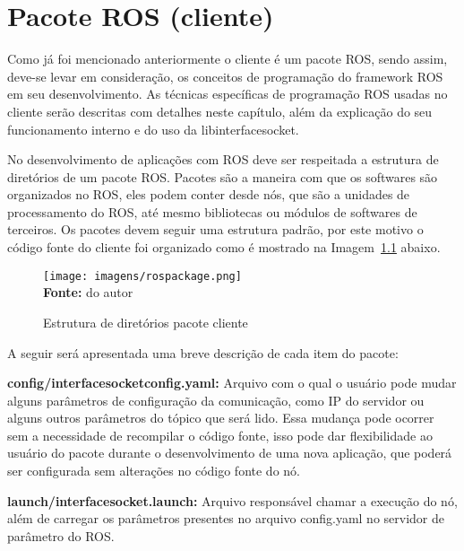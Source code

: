 \chapter{Pacote ROS (cliente)}\label{cap:cliente}

Como já foi mencionado anteriormente o cliente é um pacote ROS, sendo assim, deve-se levar em consideração, os conceitos de programação do framework ROS em seu desenvolvimento. As técnicas específicas de programação ROS usadas no cliente serão descritas com detalhes neste capítulo, além da explicação do seu funcionamento interno e do uso da libinterfacesocket.

No desenvolvimento de aplicações com ROS deve ser respeitada a estrutura de diretórios  de um pacote ROS\@. Pacotes são a maneira com que os softwares são organizados no ROS, eles podem conter desde nós, que são a unidades de processamento do ROS, até mesmo bibliotecas ou módulos de softwares de terceiros. Os pacotes devem seguir uma estrutura padrão, por este motivo o código fonte do cliente foi organizado como é mostrado na Imagem~\ref{fig:clientdiretorios} abaixo.

\begin{figure}[ht]
	\caption{Estrutura de diretórios pacote cliente}
	\begin{center}
		\texttt{[image: imagens/rospackage.png]}\\
		{\small \textbf{Fonte:} do autor}
    \end{center}\label{fig:clientdiretorios}
\end{figure}

A seguir será apresentada uma breve descrição de cada item do pacote:
 
\textbf{config/interface\underline{\hspace{.07in}}socket\underline{\hspace{.07in}}config.yaml:} Arquivo com o qual o usuário pode mudar alguns parâmetros de configuração da comunicação, como IP do servidor ou alguns outros parâmetros do tópico que será lido. Essa mudança pode ocorrer sem a necessidade de recompilar o código fonte, isso pode dar flexibilidade ao usuário do pacote durante o desenvolvimento de uma nova aplicação, que poderá ser configurada sem alterações no código fonte do nó. 

\textbf{launch/interface\underline{\hspace{.07in}}socket.launch:} Arquivo responsável chamar a execução do nó, além de carregar os parâmetros presentes no arquivo config.yaml no servidor de parâmetro do ROS\@.

